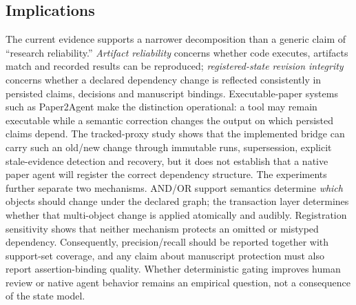 \documentclass[journal]{IEEEtran}
\begin{document}
\subsection{Implications}
The current evidence supports a narrower decomposition than a generic claim of ``research reliability.'' \emph{Artifact reliability} concerns whether code executes, artifacts match and recorded results can be reproduced; \emph{registered-state revision integrity} concerns whether a declared dependency change is reflected consistently in persisted claims, decisions and manuscript bindings. Executable-paper systems such as Paper2Agent make the distinction operational: a tool may remain executable while a semantic correction changes the output on which persisted claims depend. The tracked-proxy study shows that the implemented bridge can carry such an old/new change through immutable runs, supersession, explicit stale-evidence detection and recovery, but it does not establish that a native paper agent will register the correct dependency structure. The experiments further separate two mechanisms. AND/OR support semantics determine \emph{which} objects should change under the declared graph; the transaction layer determines whether that multi-object change is applied atomically and audibly. Registration sensitivity shows that neither mechanism protects an omitted or mistyped dependency. Consequently, precision/recall should be reported together with support-set coverage, and any claim about manuscript protection must also report assertion-binding quality. Whether deterministic gating improves human review or native agent behavior remains an empirical question, not a consequence of the state model.
\end{document}
